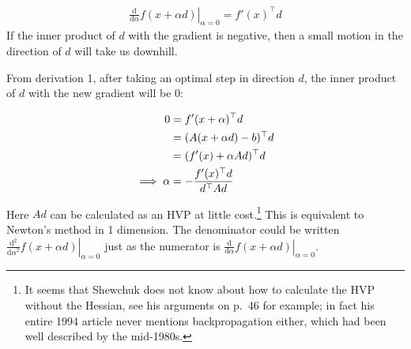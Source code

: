 \documentclass[11pt]{article}
\newcommand{\T}{\top}
\renewcommand{\(}{\left(}
\renewcommand{\)}{\right)}
\newcommand{\ud}{\mathrm{d}}
\newcommand{\dby}[2]{\frac{\ud #1}{\ud #2}}
\newcommand{\dbyt}[2]{\frac{\ud^2 #1}{{\ud #2}^2}}
\begin{document}
\begin{enumerate}
\begin{align}
\left.\dby{}{\alpha}f(x+\alpha d) \right|_{\alpha=0} = f'(x)^\T d
\end{align}
If the inner product of $d$ with the gradient is negative, then a
small motion in the direction of $d$ will take us downhill. \label{downhill}


  From derivation 1, after taking an optimal step in direction $d$, the inner product of $d$ with the new gradient will be 0:

\begin{align}
  0 &= f'(x+\alpha)^\T d \\
  &= (A(x+\alpha d)-b)^\T d \\
  &= (f'(x)+\alpha A d)^\T d \\
\implies  \alpha &= -{f'(x)^\T d \over d^\T A d}
\end{align}

Here $Ad$ can be calculated as an HVP at little cost.\footnote{It
seems that Shewchuk does not know about how to calculate the HVP
without the Hessian, see his arguments on p.~46 for example; in fact
his entire 1994 article never mentions backpropagation either, which
had been well described by the mid-1980s.} This is equivalent to
Newton's method in 1 dimension. The denominator could be written
$\left. \dbyt{}{\alpha}f(x+\alpha d) \right|_{\alpha=0}$ just as the
numerator is $\left. \dby{}{\alpha}f(x+\alpha d) \right|_{\alpha=0}$.


\end{enumerate}
\end{document}
